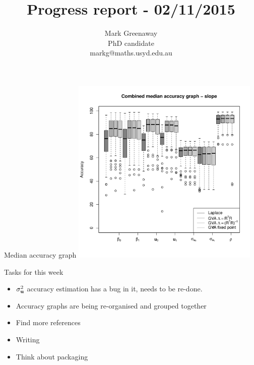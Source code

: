 \documentclass{beamer}
\title{Progress report - 02/11/2015}
\author{Mark Greenaway\\PhD candidate\\markg@maths.usyd.edu.au}
\begin{document}
\begin{frame}
\maketitle
\end{frame}

\begin{frame}{Median accuracy graph}
\includegraphics[width=90mm, height=90mm]{code/results/median_accuracy_combined_slope.pdf}
\end{frame}

\begin{frame}{Tasks for this week}
\begin{itemize}
\item $\sigma_{\bf u}^2$ accuracy estimation has a bug in it, needs to be re-done.
\item Accuracy graphs are being re-organised and grouped together
\item Find more references
\item Writing
\item Think about packaging
\end{itemize}
\end{frame}
\end{document}
